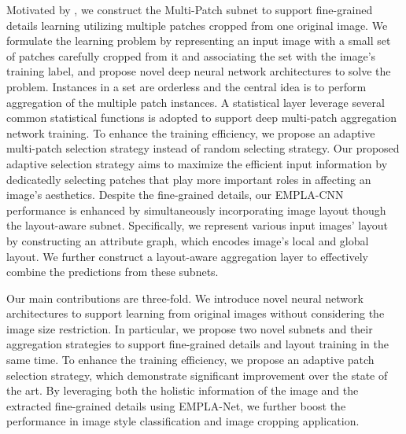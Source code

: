 \documentclass[10pt,twocolumn,letterpaper]{article}
\begin{document}
Motivated by \cite{Lu}, we construct the Multi-Patch subnet to support fine-grained
details learning utilizing multiple patches cropped from one original image.
We formulate the learning problem by representing an input image with a small
set of patches carefully cropped from it and associating the set with the image's 
training label, and propose novel deep neural network architectures to solve 
the problem. Instances in a set are orderless and the central idea is
to perform aggregation of the multiple patch instances. A statistical layer leverage
several common statistical functions is adopted to support deep multi-patch 
aggregation network training. To enhance the training 
efficiency, we propose an adaptive multi-patch selection strategy instead of 
random selecting strategy. Our proposed adaptive selection strategy aims to
maximize the efficient input information by dedicatedly selecting patches that
play more important roles in affecting an image's aesthetics.
Despite the fine-grained details, our EMPLA-CNN performance is enhanced by 
simultaneously incorporating image layout though the layout-aware subnet. 
Specifically, we represent various input images' layout by constructing an 
attribute graph, which encodes image's local and global layout. We further 
construct a layout-aware aggregation layer to effectively combine the predictions 
from these subnets.

Our main contributions are three-fold. We introduce novel neural network architectures to
support learning from original images without considering the image size restriction.
In particular, we propose two novel subnets and their aggregation strategies to support 
fine-grained details and layout training in the same time. To enhance the training 
efficiency, we propose an adaptive patch selection strategy, which demonstrate significant
improvement over the state of the art. By leveraging both the holistic information 
of the image and the extracted fine-grained details using EMPLA-Net, we further boost the 
performance in image style classification and image cropping application.
\end{document}
